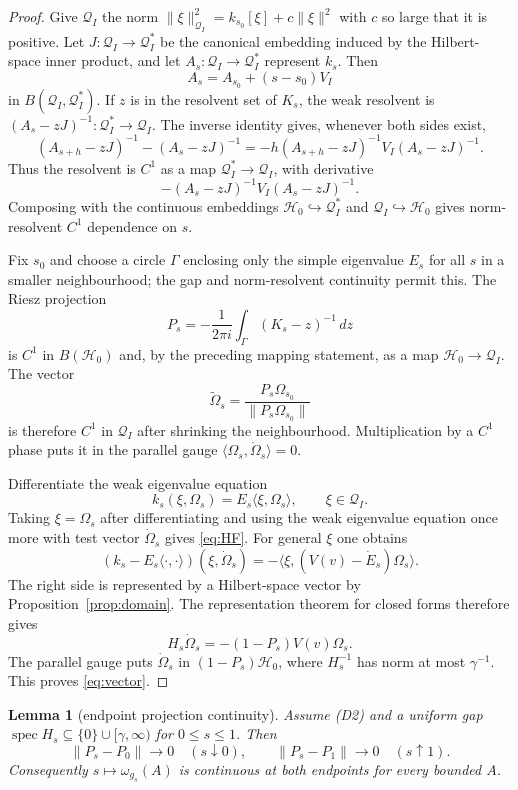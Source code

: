 \documentclass[11pt,a4paper]{article}
\newtheorem{lemma}[theorem]{Lemma}
\theoremstyle{remark}
\newcommand{\Hh}{\mathcal H_0}
\newcommand{\Om}{\Omega}
\newcommand{\Q}{\mathcal Q}
\DeclareMathOperator{\spec}{spec}
\begin{document}
\begin{proof}
Give $\Q_I$ the norm
$\|\xi\|_{\Q_I}^2=k_{s_0}[\xi]+c\|\xi\|^2$ with $c$ so large that it is positive.  Let
$J:\Q_I\to\Q_I^*$ be the canonical embedding induced by the Hilbert-space inner product, and
let $A_s:\Q_I\to\Q_I^*$ represent $k_s$.  Then
\[
 A_s=A_{s_0}+(s-s_0)V_I
\]
in $B(\Q_I,\Q_I^*)$.  If $z$ is in the resolvent set of $K_s$, the weak resolvent is
$(A_s-zJ)^{-1}:\Q_I^*\to\Q_I$.  The inverse identity gives, whenever both sides exist,
\[
 (A_{s+h}-zJ)^{-1}-(A_s-zJ)^{-1}
 =-h(A_{s+h}-zJ)^{-1}V_I(A_s-zJ)^{-1}.
\]
Thus the resolvent is $C^1$ as a map $\Q_I^*\to\Q_I$, with derivative
\[
 - (A_s-zJ)^{-1}V_I(A_s-zJ)^{-1}.
\]
Composing with the continuous embeddings $\Hh\hookrightarrow\Q_I^*$ and
$\Q_I\hookrightarrow\Hh$ gives norm-resolvent $C^1$ dependence on $s$.

Fix $s_0$ and choose a circle $\Gamma$ enclosing only the simple eigenvalue $E_s$ for all $s$ in
a smaller neighbourhood; the gap and norm-resolvent continuity permit this.  The Riesz projection
\[
 P_s=-\frac{1}{2\pi i}\int_\Gamma(K_s-z)^{-1}\,dz
\]
is $C^1$ in $B(\Hh)$ and, by the preceding mapping statement, as a map $\Hh\to\Q_I$.  The vector
\[
 \widetilde\Om_s=\frac{P_s\Om_{s_0}}{\|P_s\Om_{s_0}\|}
\]
is therefore $C^1$ in $\Q_I$ after shrinking the neighbourhood.  Multiplication by a $C^1$ phase
puts it in the parallel gauge $\langle\Om_s,\dot\Om_s\rangle=0$.

Differentiate the weak eigenvalue equation
\[
 k_s(\xi,\Om_s)=E_s\langle\xi,\Om_s\rangle,
 \qquad \xi\in\Q_I.
\]
Taking $\xi=\Om_s$ after differentiating and using the weak eigenvalue equation once more with
test vector $\dot\Om_s$ gives \eqref{eq:HF}.  For general $\xi$ one obtains
\[
 (k_s-E_s\langle\cdot,\cdot\rangle)(\xi,\dot\Om_s)
 =-\langle\xi,(V(v)-\dot E_s)\Om_s\rangle.
\]
The right side is represented by a Hilbert-space vector by Proposition~\ref{prop:domain}.
The representation theorem for closed forms therefore gives
\[
 H_s\dot\Om_s=-(1-P_s)V(v)\Om_s.
\]
The parallel gauge puts $\dot\Om_s$ in $(1-P_s)\Hh$, where $H_s^{-1}$ has norm at most
$\gamma^{-1}$.  This proves \eqref{eq:vector}.
\end{proof}

\begin{lemma}[endpoint projection continuity]\label{lem:endpoint}
Assume (D2) and a uniform gap
$\spec H_s\subseteq\{0\}\cup[\gamma,\infty)$ for $0\le s\le1$.  Then
\[
 \|P_s-P_0\|\longrightarrow0\quad(s\downarrow0),
 \qquad
 \|P_s-P_1\|\longrightarrow0\quad(s\uparrow1).
\]
Consequently $s\mapsto\omega_{g_s}(A)$ is continuous at both endpoints for every bounded $A$.
\end{lemma}
\end{document}
